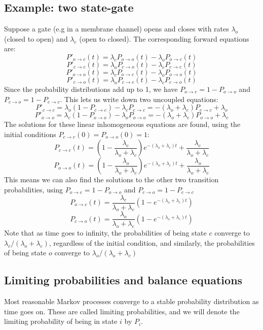 \documentclass[11pt]{book}
\begin{document}
\subsection{Example: two state-gate}
Suppose a gate (e.g in a membrane channel) opens and closes with rates $\lambda_o$ (closed to open) and $\lambda_c$ (open to closed). The corresponding forward equations are:
$$ P'_{o \rightarrow c}(t) = \lambda_c P_{o \rightarrow o}(t) - \lambda_o P_{o \rightarrow c}(t)$$
$$ P'_{c \rightarrow c}(t) = \lambda_o P_{c \rightarrow o}(t) - \lambda_c P_{c \rightarrow c}(t)$$
$$ P'_{o \rightarrow o}(t) = \lambda_c P_{o \rightarrow c}(t) - \lambda_o P_{o \rightarrow o}(t)$$
$$ P'_{c \rightarrow o}(t) =  \lambda_o P_{c \rightarrow c}(t) -\lambda_c P_{c \rightarrow o}(t)$$
Since the probability distributions add up to 1, we have $P_{o \rightarrow c} = 1 - P_{o \rightarrow o} $ and $P_{c \rightarrow o} = 1 - P_{c \rightarrow c} $. This lets us write down two uncoupled equations:
$$  P'_{c \rightarrow c} = \lambda_o (1- P_{c \rightarrow c}) - \lambda_c  P_{c \rightarrow c} = -(\lambda_o  + \lambda_c)P_{c \rightarrow c} +  \lambda_o $$
$$  P'_{o \rightarrow o} = \lambda_c (1- P_{o \rightarrow o}) - \lambda_o P_{o \rightarrow o} = -(\lambda_o  + \lambda_c)P_{o \rightarrow o} + \lambda_c $$
The solutions for these linear inhomogeneous equations are found, using the initial conditions $ P_{c \rightarrow c}(0) = P_{o \rightarrow o}(0) = 1$:
$$ P_{c \rightarrow c} (t) = \left(1 - \frac{\lambda_c}{\lambda_o  + \lambda_c} \right) e^{-(\lambda_o  + \lambda_c)t} + \frac{\lambda_c}{\lambda_o  + \lambda_c} $$
$$ P_{o \rightarrow o} (t) = \left(1 - \frac{\lambda_o}{\lambda_o  + \lambda_c} \right) e^{-(\lambda_o  + \lambda_c)t} + \frac{\lambda_o}{\lambda_o  + \lambda_c} $$
This means we can also find the solutions to the other two transition probabilities, using $P_{o \rightarrow c} = 1 - P_{o \rightarrow o} $ and $P_{c \rightarrow o} = 1 - P_{c \rightarrow c} $
$$ P_{o \rightarrow c} (t) = \frac{\lambda_c}{\lambda_o  + \lambda_c} \left(1 - e^{-(\lambda_o  + \lambda_c)t}  \right)  $$
$$ P_{c \rightarrow o} (t) = \frac{\lambda_o}{\lambda_o  + \lambda_c}\left(1 - e^{-(\lambda_o  + \lambda_c)t}  \right) $$
Note that as time goes to infinity, the probabilities of being state $c$ converge to $\lambda_c /(\lambda_o  + \lambda_c)$, regardless of the initial condition, and similarly, the probabilities of being state $o$ converge to $\lambda_o /(\lambda_o  + \lambda_c)$
 
\subsection{Limiting probabilities and balance equations}
Most reasonable Markov processes converge to a stable probability distribution as time goes on. These are called limiting probabilities, and we will denote the limiting probability of being in state $i$ by $P_i$. 
\end{document}

